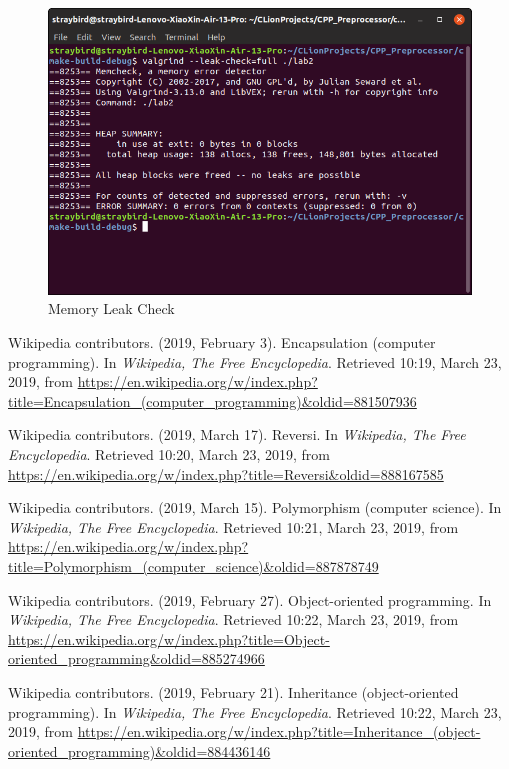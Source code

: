 \documentclass[a4paper]{report}
\begin{document}
\begin{figure}
  \centering
  \includegraphics[width=12cm]{mem.png}
  \caption{Memory Leak Check}\label{2}
\end{figure}
\begin{thebibliography}{A}

Wikipedia contributors. (2019, February 3). Encapsulation (computer programming). In \emph{Wikipedia, The Free Encyclopedia}. Retrieved 10:19, March 23, 2019, from \url{https://en.wikipedia.org/w/index.php?title=Encapsulation_(computer_programming)&oldid=881507936}

Wikipedia contributors. (2019, March 17). Reversi. In \emph{Wikipedia, The Free Encyclopedia}. Retrieved 10:20, March 23, 2019, from \url{https://en.wikipedia.org/w/index.php?title=Reversi&oldid=888167585}

Wikipedia contributors. (2019, March 15). Polymorphism (computer science). In \emph{Wikipedia, The Free Encyclopedia}. Retrieved 10:21, March 23, 2019, from \url{https://en.wikipedia.org/w/index.php?title=Polymorphism_(computer_science)&oldid=887878749}

Wikipedia contributors. (2019, February 27). Object-oriented programming. In \emph{Wikipedia, The Free Encyclopedia}. Retrieved 10:22, March 23, 2019, from \url{https://en.wikipedia.org/w/index.php?title=Object-oriented_programming&oldid=885274966}

Wikipedia contributors. (2019, February 21). Inheritance (object-oriented programming). In \emph{Wikipedia, The Free Encyclopedia}. Retrieved 10:22, March 23, 2019, from \url{https://en.wikipedia.org/w/index.php?title=Inheritance_(object-oriented_programming)&oldid=884436146}

\end{thebibliography}
\end{document}
